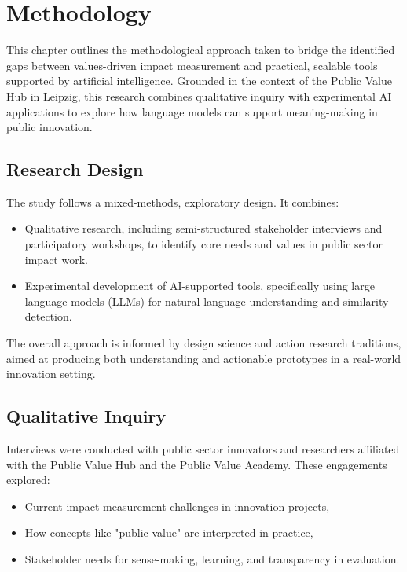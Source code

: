 \chapter{Methodology}

This chapter outlines the methodological approach taken to bridge the identified gaps between values-driven impact measurement and practical, scalable tools supported by artificial intelligence. Grounded in the context of the Public Value Hub in Leipzig, this research combines qualitative inquiry with experimental AI applications to explore how language models can support meaning-making in public innovation.

\section{Research Design}

The study follows a mixed-methods, exploratory design. It combines:
\begin{itemize}
    \item Qualitative research, including semi-structured stakeholder interviews and participatory workshops, to identify core needs and values in public sector impact work.
    \item Experimental development of AI-supported tools, specifically using large language models (LLMs) for natural language understanding and similarity detection.
\end{itemize}

The overall approach is informed by design science and action research traditions, aimed at producing both understanding and actionable prototypes in a real-world innovation setting.

\section{Qualitative Inquiry}

Interviews were conducted with public sector innovators and researchers affiliated with the Public Value Hub and the Public Value Academy. These engagements explored:

\begin{itemize}
    \item Current impact measurement challenges in innovation projects,
    \item How concepts like "public value" are interpreted in practice,
    \item Stakeholder needs for sense-making, learning, and transparency in evaluation.
\end{itemize}

